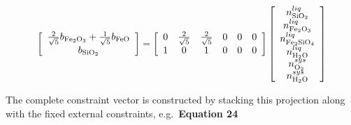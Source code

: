 \documentclass[11pt, titlepage, twoside]{article}
\begin{document}
\begin{MPEquation}[!ht]
\begin{equation}
\left[ {\begin{array}{*{20}{c}}
{\frac{2}{{\sqrt 5 }}{b_{{\rm{F}}{{\rm{e}}_{\rm{2}}}{{\rm{O}}_{\rm{3}}}}} + \frac{1}{{\sqrt 5 }}{b_{{\rm{FeO}}}}}\\
{{b_{{\rm{Si}}{{\rm{O}}_{\rm{2}}}}}}
\end{array}} \right] = \left[ {\begin{array}{*{20}{c}}
0&{\frac{2}{{\sqrt 5 }}}&{\frac{2}{{\sqrt 5 }}}&0&0&0\\
1&0&1&0&0&0
\end{array}} \right]\left[ {\begin{array}{*{20}{c}}
{n_{{\rm{Si}}{{\rm{O}}_2}}^{liq}}\\
{n_{{\rm{F}}{{\rm{e}}_2}{{\rm{O}}_3}}^{liq}}\\
{n_{{\rm{F}}{{\rm{e}}_2}{\rm{Si}}{{\rm{O}}_4}}^{liq}}\\
{n_{{{\rm{H}}_2}{\rm{O}}}^{liq}}\\
{n_{{{\rm{O}}_2}}^{sys}}\\
{n_{{{\rm{H}}_2}{\rm{O}}}^{sys}}
\end{array}} \right]
\end{equation}
\label{MPEquationElement:AA5D2915-5818-491A-F436-DCE30B61AAF7}
\end{MPEquation}
The complete constraint vector is constructed by stacking this projection along with the fixed external constraints, e.g.\ \textbf{Equation 24}
\end{document}

